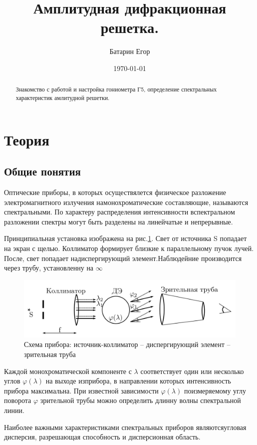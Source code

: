 \documentclass[a4paper,12pt]{article}
\author{Батарин Егор}
\title{Амплитудная дифракционная решетка.}
\date{\today}
\theoremstyle{plain} %
\theoremstyle{definition} %
\theoremstyle{remark} %
\begin{document}
	
	\maketitle
	
	\begin{abstract}
		
		Знакомство с работой и настройка гониометра Г5, определение спектральных характеристик амлитудной решетки.
		
	\end{abstract}
	

\section{Теория}

\subsection{Общие понятия}
Оптические приборы, в которых осуществялется физическое разложение электромагнитного излучения намонохроматические составляющие, называются спектральными. По характеру распределения интенсивности вспектральном разложении спектры могут быть разделены на линейчатые и непрерывные. \par 
Принципиальная установка изображена на рис.\ref{p1}. Свет от источника S попадает на экран с щелью. Коллиматор формирует близкие к параллельному пучок лучей. После, свет попадает надиспергирующий элемент.Наблюдейние производится через трубу, установленну на $\infty$


\begin{figure}[h!]
	\begin{center}
		\includegraphics[scale = 0.5]{p1.png}
		\caption{Схема прибора: источник-коллиматор – диспергирующий элемент – зрительная труба}
		\label{p1}
	\end{center}
\end{figure}

Каждой монохроматической компоненте с $\lambda$ соответствует один или несколько углов $\varphi(\lambda)$ на выходе изприбора, в направлении которых интенсивность прибора максимальна. При известной зависимости $\varphi(\lambda)$ поизмеряемому углу поворота $\varphi$ зрительной трубы можно определить длинну волны спектральной линии. \par 
Наиболее важными характеристиками спектральных приборов являютсяугловая дисперсия, разрешающая способность и дисперсионная область.
\end{document}
